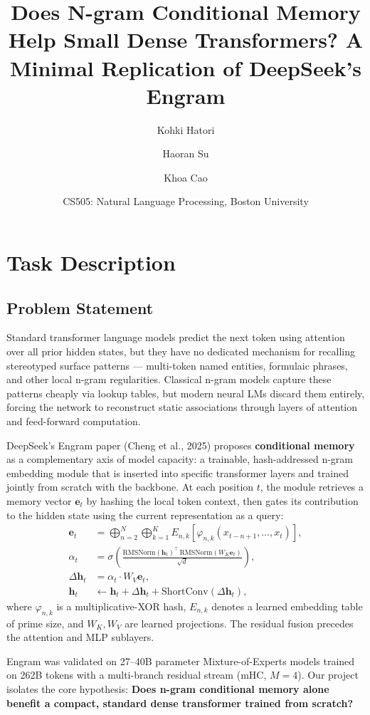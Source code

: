 \documentclass[11pt]{article}
\title{Does N-gram Conditional Memory Help Small Dense Transformers? A Minimal Replication of DeepSeek's Engram}
\author{Kohki Hatori \and Haoran Su \and Khoa Cao}
\date{CS505: Natural Language Processing, Boston University}
\begin{document}
\maketitle

\section{Task Description}
\subsection{Problem Statement}

Standard transformer language models predict the next token using attention over all prior hidden states, but they have no dedicated mechanism for recalling stereotyped surface patterns — multi-token named entities, formulaic phrases, and other local n-gram regularities. Classical n-gram models capture these patterns cheaply via lookup tables, but modern neural LMs discard them entirely, forcing the network to reconstruct static associations through layers of attention and feed-forward computation.

DeepSeek's Engram paper (Cheng et al., 2025) proposes \textbf{conditional memory} as a complementary axis of model capacity: a trainable, hash-addressed n-gram embedding module that is inserted into specific transformer layers and trained jointly from scratch with the backbone. At each position $t$, the module retrieves a memory vector $\mathbf{e}_t$ by hashing the local token context, then gates its contribution to the hidden state using the current representation as a query:
\begin{align}
\mathbf{e}_t &= \bigoplus_{n=2}^{N} \bigoplus_{k=1}^{K} E_{n,k}\left[\varphi_{n,k}(x_{t-n+1}, \ldots, x_t)\right], \\
\alpha_t &= \sigma\left(\frac{\mathrm{RMSNorm}(\mathbf{h}_t)^{\top} \, \mathrm{RMSNorm}(W_K \mathbf{e}_t)}{\sqrt{d}}\right), \\
\Delta \mathbf{h}_t &= \alpha_t \cdot W_V \mathbf{e}_t, \\
\mathbf{h}_t &\leftarrow \mathbf{h}_t + \Delta \mathbf{h}_t + \mathrm{ShortConv}(\Delta \mathbf{h}_t),
\end{align}
where $\varphi_{n,k}$ is a multiplicative-XOR hash, $E_{n,k}$ denotes a learned embedding table of prime size, and $W_K, W_V$ are learned projections. The residual fusion precedes the attention and MLP sublayers.

Engram was validated on 27--40B parameter Mixture-of-Experts models trained on 262B tokens with a multi-branch residual stream (mHC, $M=4$). Our project isolates the core hypothesis: \textbf{Does n-gram conditional memory alone benefit a compact, standard dense transformer trained from scratch?}
\end{document}
